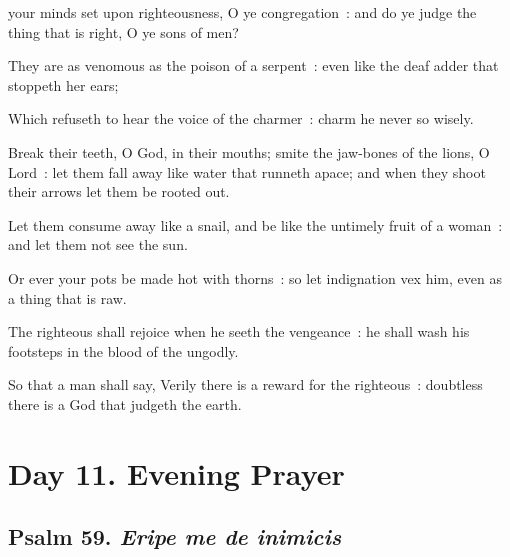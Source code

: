  your minds set upon righteousness, O ye congregation~: and do ye judge the thing that is right, O ye sons of men?\par
{}
They are as venomous as the poison of a serpent~: even like the deaf adder that stoppeth her ears;\par
{}Which refuseth to hear the voice of the charmer~: charm he never so wisely.\par
{}Break their teeth, O God, in their mouths; smite the jaw-bones of the lions, O Lord~: let them fall away like water that runneth apace; and when they shoot their arrows let them be rooted out.\par
{}Let them consume away like a snail, and be like the untimely fruit of a woman~: and let them not see the sun.\par
{}Or ever your pots be made hot with thorns~: so let indignation vex him, even as a thing that is raw.\par
{}The righteous shall rejoice when he seeth the vengeance~: he shall wash his footsteps in the blood of the ungodly.\par
{}So that a man shall say, Verily there is a reward for the righteous~: doubtless there is a God that judgeth the earth.\par

\section*{Day 11. Evening Prayer}

\subsection{Psalm 59. \textit{Eripe me de inimicis}}

